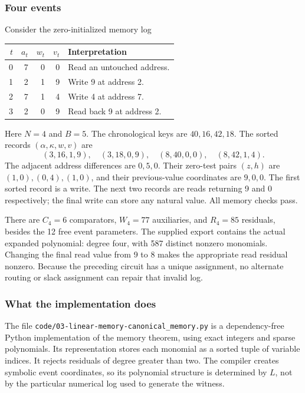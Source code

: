 \documentclass[11pt,a4paper]{article}
\theoremstyle{definition}
\theoremstyle{remark}
\newcommand{\repo}[1]{\nolinkurl{#1}}
\begin{document}
\subsubsection{Four events}
Consider the zero-initialized memory log
\begin{center}
\begin{tabular}{@{}rrrrl@{}}
\toprule
$t$ & $a_t$ & $w_t$ & $v_t$ & Interpretation \\
\midrule
0 & 7 & 0 & 0 & Read an untouched address.\\
1 & 2 & 1 & 9 & Write 9 at address 2.\\
2 & 7 & 1 & 4 & Write 4 at address 7.\\
3 & 2 & 0 & 9 & Read back 9 at address 2.\\
\bottomrule
\end{tabular}
\end{center}
Here $N=4$ and $B=5$. The chronological keys are $40,16,42,18$. The sorted
records $(\alpha,\kappa,w,v)$ are
\[
 (3,16,1,9),\quad(3,18,0,9),\quad(8,40,0,0),\quad(8,42,1,4).
\]
The adjacent address differences are $0,5,0$. Their zero-test pairs $(z,h)$ are
$(1,0),(0,4),(1,0)$, and their previous-value coordinates are $9,0,0$.
The first sorted record is a write. The next two records are reads returning
9 and 0 respectively; the final write can store any natural value. All memory
checks pass.

There are $C_4=6$ comparators, $W_4=77$ auxiliaries, and $R_4=85$ residuals,
besides the 12 free event parameters. The supplied export contains the actual
expanded polynomial: degree four, with 587 distinct nonzero monomials.
Changing the final read value from 9 to 8 makes the appropriate read residual
nonzero. Because the preceding circuit has a unique assignment, no alternate
routing or slack assignment can repair that invalid log.

\subsubsection{What the implementation does}
The file \repo{code/03-linear-memory-canonical_memory.py} is a dependency-free Python
implementation of the memory theorem, using exact integers and sparse
polynomials. Its representation stores each monomial as a sorted tuple of
variable indices. It rejects residuals of degree greater than two. The compiler
creates symbolic event coordinates, so its polynomial structure is determined
by $L$, not by the particular numerical log used to generate the witness.
\end{document}
